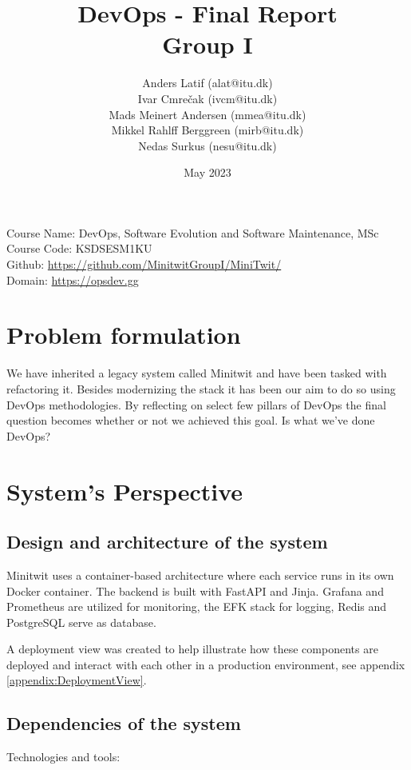 \documentclass{article}
\title{DevOps - Final Report\\
  \large Group I
}
\author{
Anders Latif (alat@itu.dk)\\
Ivar Cmrečak (ivcm@itu.dk)\\
Mads Meinert Andersen (mmea@itu.dk) \\
Mikkel Rahlff Berggreen (mirb@itu.dk)\\ 
Nedas Surkus (nesu@itu.dk)\\
}
\date{May 2023}
\begin{document}
\maketitle

\vspace*{\fill}
\noindent Course Name: DevOps, Software Evolution and Software Maintenance, MSc\\
Course Code: KSDSESM1KU\\
Github: \url{https://github.com/MinitwitGroupI/MiniTwit/}\\
Domain: \url{https://opsdev.gg}


\pagebreak

\tableofcontents
\pagebreak

\section{Problem formulation}

We have inherited a legacy system called Minitwit and have been tasked with refactoring it. Besides modernizing the stack it has been our aim to do so using DevOps methodologies. By reflecting on select few pillars of DevOps the final question becomes whether or not we achieved this goal. Is what we've done DevOps?

\section{System's Perspective} 

\subsection{Design and architecture of the system}

Minitwit uses a container-based architecture where each service runs in its own Docker container. The backend is built with FastAPI and Jinja. Grafana and Prometheus are utilized for monitoring, the EFK stack for logging, Redis and PostgreSQL serve as database.

A deployment view was created to help illustrate how these components are deployed and interact with each other in a production environment, see appendix \ref{appendix:DeploymentView}. 

\subsection{Dependencies of the system}

Technologies and tools:
\end{document}
